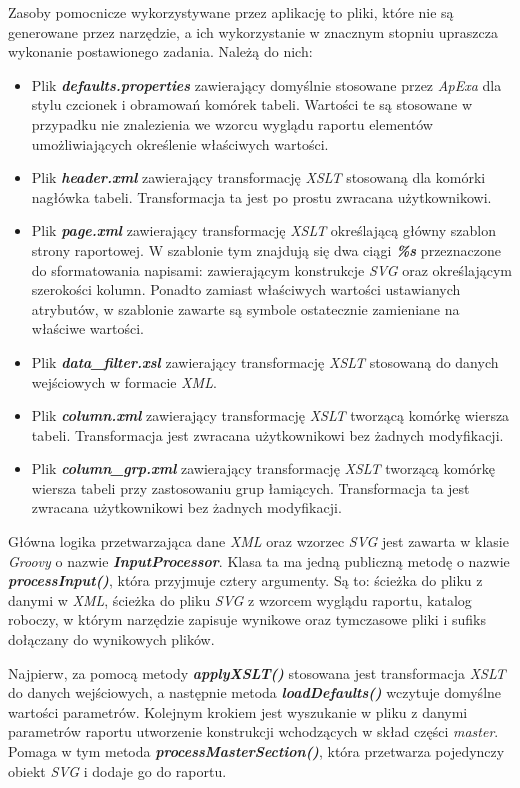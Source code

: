 \documentclass[11pt,a4paper]{article}
\begin{document}
Zasoby pomocnicze wykorzystywane przez aplikację to pliki, które nie są generowane przez narzędzie, a ich wykorzystanie w znacznym stopniu upraszcza wykonanie postawionego zadania. Należą do nich:
\begin{itemize}
	\item Plik \emph{\textbf{defaults.properties}} zawierający domyślnie stosowane przez \emph{ApExa} dla stylu czcionek i obramowań komórek tabeli. Wartości te są stosowane w przypadku nie znalezienia we wzorcu wyglądu raportu elementów umożliwiających określenie właściwych wartości. 
	\item Plik \emph{\textbf{header.xml}} zawierający transformację \emph{XSLT} stosowaną dla komórki nagłówka tabeli. Transformacja ta jest po prostu zwracana użytkownikowi.
	\item Plik \emph{\textbf{page.xml}} zawierający transformację \emph{XSLT} określającą główny szablon strony raportowej. W szablonie tym znajdują się dwa ciągi \emph{\textbf{\%s}} przeznaczone do sformatowania napisami: zawierającym konstrukcje \emph{SVG} oraz określającym szerokości kolumn. Ponadto zamiast właściwych wartości ustawianych atrybutów, w szablonie zawarte są symbole ostatecznie zamieniane na właściwe wartości.
	\item Plik \emph{\textbf{data\_filter.xsl}} zawierający transformację \emph{XSLT} stosowaną do danych wejściowych w formacie \emph{XML}.
	\item Plik \emph{\textbf{column.xml}} zawierający transformację \emph{XSLT} tworzącą komórkę wiersza tabeli. Transformacja jest zwracana użytkownikowi bez żadnych modyfikacji.
	\item Plik \emph{\textbf{column\_grp.xml}} zawierający transformację \emph{XSLT} tworzącą komórkę wiersza tabeli przy zastosowaniu grup łamiących. Transformacja ta jest zwracana użytkownikowi bez żadnych modyfikacji.
\end{itemize}

Główna logika przetwarzająca dane \emph{XML} oraz wzorzec \emph{SVG} jest zawarta w klasie \emph{Groovy} o nazwie \emph{\textbf{InputProcessor}}. Klasa ta ma jedną publiczną metodę o nazwie \emph{\textbf{processInput()}}, która przyjmuje cztery argumenty. Są to: ścieżka do pliku z danymi w \emph{XML}, ścieżka do pliku \emph{SVG} z wzorcem wyglądu raportu, katalog roboczy, w którym narzędzie zapisuje wynikowe oraz tymczasowe pliki i sufiks dołączany do wynikowych plików.

Najpierw, za pomocą metody \emph{\textbf{applyXSLT()}} stosowana jest transformacja \emph{XSLT} do danych wejściowych, a następnie metoda \emph{\textbf{loadDefaults()}} wczytuje domyślne wartości parametrów. Kolejnym krokiem jest wyszukanie w pliku z danymi parametrów raportu utworzenie konstrukcji wchodzących w skład części \emph{master}. Pomaga w tym metoda \emph{\textbf{processMasterSection()}}, która przetwarza pojedynczy obiekt \emph{SVG} i dodaje go do raportu. 
\end{document}

